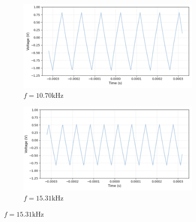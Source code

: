\documentclass{article}
\begin{document}
\begin{figure}[H]
    \centering
    \begin{subfigure}[b]{0.45\linewidth}
        \includegraphics[width=\linewidth]{2.1.ba.png}
        \caption{$f = 10.70\si{\kilo\hertz}$}
    \end{subfigure}
    \hfill
    \begin{subfigure}[b]{0.45\linewidth}
        \includegraphics[width=\linewidth]{2.1.bb.png}
        \caption{$f = 15.31\si{\kilo\hertz}$}
    \end{subfigure}
    

\end{figure}
\end{document}
